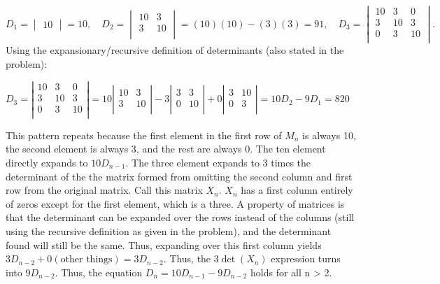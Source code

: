 \begin{enumerate}
 \[D_{1}=\begin{vmatrix}  10    \end{vmatrix} = 10, \quad D_{2}=\begin{vmatrix} 10 & 3  \\  3 & 10  \\ \end{vmatrix} =(10)(10) - (3)(3) = 91, \quad D_{3}=\begin{vmatrix}  10 & 3 & 0  \\  3 & 10 & 3  \\  0 & 3 & 10  \\  \end{vmatrix}.\]Using the expansionary/recursive definition of determinants (also stated in the problem):

 $D_{3}=\left| {\begin{array}{ccc}  10 & 3 & 0  \\  3 & 10 & 3  \\  0 & 3 & 10  \\  \end{array} } \right|=10\left| {\begin{array}{cc}  10 & 3  \\  3 & 10  \\  \end{array} } \right| - 3\left| {\begin{array}{cc}  3 & 3  \\  0 & 10  \\  \end{array} } \right| + 0\left| {\begin{array}{cc}  3 & 10  \\  0 & 3  \\  \end{array} } \right| = 10D_{2} - 9D_{1} = 820$

 This pattern repeats because the first element in the first row of $M_{n}$ is always 10, the second element is always 3, and the rest are always 0. The ten element directly expands to $10D_{n-1}$. The three element expands to 3 times the determinant of the the matrix formed from omitting the second column and first row from the original matrix. Call this matrix $X_{n}$. $X_{n}$ has a first column entirely of zeros except for the first element, which is a three. A property of matrices is that the determinant can be expanded over the rows instead of the columns (still using the recursive definition as given in the problem), and the determinant found will still be the same. Thus, expanding over this first column yields $3D_{n-2} + 0(\text{other things})=3D_{n-2}$. Thus, the $3 \det(X_{n})$ expression turns into $9D_{n-2}$. Thus, the equation $D_{n}=10D_{n-1}-9D_{n-2}$ holds for all n > 2.


\end{enumerate}
